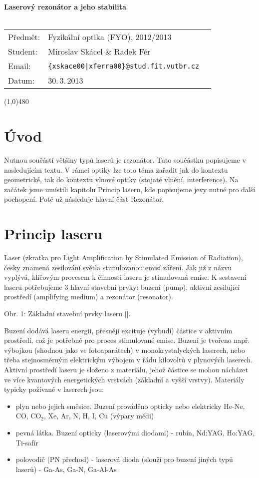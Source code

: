 \documentclass[a4paper,12pt]{article}
\begin{document}
\renewcommand{\refname}{Literatura}
\thispagestyle{empty}
{\LARGE \bf Laserový rezonátor a jeho stabilita}\\
\\
{\large
\begin{tabularx}{\textwidth}{l l X}
    Předmět: & Fyzikální optika (FYO), 2012/2013 & \\
    Student: & Miroslav Skácel \& Radek Fér & \\
    Email: & \texttt{\{xskace00|xferra00\}@stud.fit.vutbr.cz} & \\
Datum: & 30.\,3.\,2013 & \\
\end{tabularx}}
\begin{center}
\line(1,0){480}
\end{center}
\section{Úvod}
Nutnou součástí většiny typů laserů je rezonátor. Tuto součástku popisujeme v nasledujícím textu. V rámci optiky lze toto téma zařadit jak do kontextu geometrické, tak do kontextu vlnové optiky (stojaté vlnění, interference).
Na začátek jsme umístili kapitolu Princip laseru, kde popisujeme jevy nutné pro další pochopení. Poté už následuje hlavní část Rezonátor.

\section{Princip laseru}
Laser (zkratka pro Light Amplification by Stimulated Emission of Radiation), česky znamená zesilování světla stimulovanou emisí záření. Jak již z názvu vyplývá, klíčovým procesem k činnosti laseru je stimulovaná emise. K sestavení laseru potřebujeme 3 hlavní stavební prvky: buzení (pump), aktivní zesilující prostředí (amplifying medium) a rezonátor (resonator).


Obr. 1: Základní stavební prvky laseru [\cite{optics, p. 350}].

Buzení dodává laseru energii, přesněji excituje (vybudí) částice v aktivním prostředí, což je potřebné pro proces stimulované emise. Buzení je tvořeno např. výbojkou (shodnou jako ve fotoaparátech) v monokrystalyckých laserech, nebo třeba stejnosměrným elektrickým výbojem v řádu kilovoltů v plynových laserech. Aktivní prostředí laseru je složeno z materiálu, jehož částice se mohou nácházet ve více kvantových energetických vrstvách (základní a vyšší vrstvy). 
Materiály typicky požívané v laserech jsou:
\begin{itemize}
\item plyn nebo jejich směsice. Buzení prováděno opticky nebo elektricky He-Ne, CO, CO$_2$, Xe, Ar, N, H, I, Cu (výpary mědi)
\item pevná látka. Buzení opticky (laserovými diodami) - rubín, Nd:YAG, Ho:YAG, Ti-safír
\item polovodič (PN přechod) - laserová dioda (slouží pro buzení jiných typů laserů) - Ga-As, Ga-N, Ga-Al-As
    \end{itemize}
\end{document}
